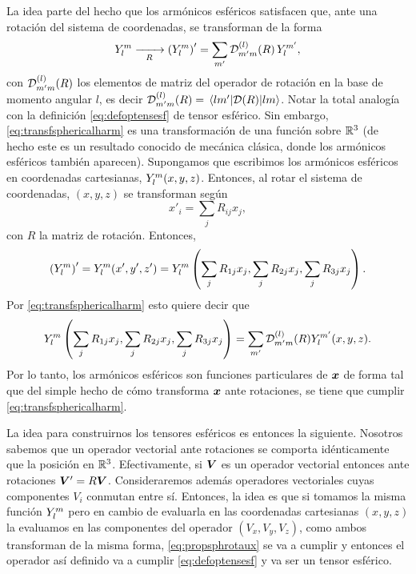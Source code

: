 \documentclass[10pt, a4paper]{article}
\numberwithin{equation}{subsection}
\begin{document}
La idea parte del hecho que los armónicos esféricos satisfacen que, ante una
rotación del sistema de coordenadas, se transforman de la forma
\begin{equation} \label{eq:transfsphericalharm}
  \SphericalHarmonic{l}{m} \xrightarrow[R]{\qquad}
    \left(\SphericalHarmonic{l}{m}\right)' = 
    \sum_{m'} \RotationOp^{(l)}_{m'm}(R)\,\SphericalHarmonic{l}{m'},
\end{equation}
con $\RotationOp^{(l)}_{m'm}(R)$ los elementos de matriz del operador de
rotación en la base de momento angular $l$, es decir
$\RotationOp^{(l)}_{m'm}(R) = \matrixel{lm'}{\RotationOp(R)}{lm}$. Notar la
total analogía con la definición \eqref{eq:defoptensesf} de tensor esférico.
Sin embargo, \eqref{eq:transfsphericalharm} es una transformación de una
función sobre $\mathbb{R}^3$ (de hecho este es un resultado conocido de mecánica
clásica, donde los armónicos esféricos también aparecen). Supongamos que
escribimos los armónicos esféricos en coordenadas cartesianas,
$\SphericalHarmonic{l}{m}(x,y,z)$. Entonces, al rotar el sistema de coordenadas,
$(x,y,z)$ se transforman según
\begin{equation}
  x'_i = \sum_j R_{ij} x_j,
\end{equation} con $R$ la matriz de rotación. Entonces,
\begin{equation}
  \left(\SphericalHarmonic{l}{m}\right)' = \SphericalHarmonic{l}{m}(x', y', z')
  = \SphericalHarmonic{l}{m}\left(\sum_j R_{1j}x_j, \sum_j R_{2j}x_j, \sum_j
  R_{3j}x_j\right).
\end{equation}
Por \eqref{eq:transfsphericalharm} esto quiere decir que
\begin{equation} \label{eq:propsphrotaux}
  \SphericalHarmonic{l}{m}\left(\sum_j R_{1j}x_j, \sum_j R_{2j}x_j, \sum_j
  R_{3j}x_j\right) = \sum_{m'} \RotationOp^{(l)}_{m'm}(R)
  \SphericalHarmonic{l}{m'}(x,y,z).
\end{equation}
Por lo tanto, los armónicos esféricos son funciones particulares de $\vb*{x}$
de forma tal que del simple hecho de cómo transforma $\vb*{x}$ ante
rotaciones, se tiene que cumplir \eqref{eq:transfsphericalharm}.

La idea para construirnos los tensores esféricos es entonces la siguiente.
Nosotros sabemos que un operador vectorial ante rotaciones se comporta
idénticamente que la posición en $\mathbb{R}^3$. Efectivamente, si $\vb*{V}$ es un
operador vectorial entonces ante rotaciones $\vb*{V}' = R\vb*{V}$.
Consideraremos además operadores vectoriales cuyas componentes $V_i$ conmutan
entre sí. Entonces, la idea es que si tomamos la misma función
$\SphericalHarmonic{l}{m}$ pero en cambio de evaluarla en las coordenadas
cartesianas $(x,y,z)$ la evaluamos en las componentes del operador
$(V_x,V_y,V_z)$, como ambos transforman de la misma forma,
\eqref{eq:propsphrotaux} se va a cumplir y entonces el operador así definido va
a cumplir \eqref{eq:defoptensesf} y va ser un tensor esférico.
\end{document}
